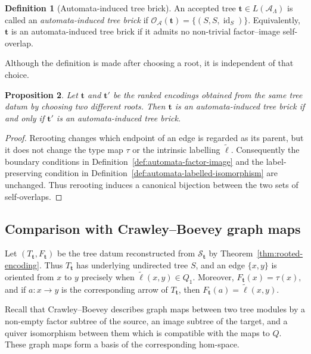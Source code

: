 \documentclass[11pt,a4paper]{amsart}
\theoremstyle{definition}
\newtheorem{definition}{Definition}[section]
\theoremstyle{plain}
\newtheorem{proposition}[definition]{Proposition}
\theoremstyle{remark}
\numberwithin{equation}{section}
\begin{document}
\begin{definition}[Automata-induced tree brick]\label{def:automata-tree-brick}
An accepted tree $\mathbf t\in L(\mathcal A_\Lambda)$ is called an \emph{automata-induced tree brick} if
$\mathscr O_{\mathcal A}(\mathbf t)
=
\{(S,S,\operatorname{id}_S)\}.$
Equivalently, $\mathbf t$ is an automata-induced tree brick if it admits no non-trivial factor--image self-overlap.
\end{definition}

Although the definition is made after choosing a root, it is independent of that choice.

\begin{proposition}\label{prop:automata-brick-rerooting}
Let $\mathbf t$ and $\mathbf t'$ be the ranked encodings obtained from the same tree datum by choosing two different roots. Then $\mathbf t$ is an automata-induced tree brick if and only if $\mathbf t'$ is an automata-induced tree brick.
\end{proposition}

\begin{proof}
Rerooting changes which endpoint of an edge is regarded as its parent, but it does not change the type map $\tau$ or the intrinsic labelling $\widetilde{\ell}$. Consequently the boundary conditions in Definition~\ref{def:automata-factor-image} and the label-preserving condition in Definition~\ref{def:automata-labelled-isomorphism} are unchanged. Thus rerooting induces a canonical bijection between the two sets of self-overlaps.
\end{proof}

\subsection{Comparison with Crawley--Boevey graph maps}

Let $(T_{\mathbf t},F_{\mathbf t})$ be the tree datum reconstructed from $\mathcal S_{\mathbf t}$ by Theorem~\ref{thm:rooted-encoding}. Thus $T_{\mathbf t}$ has underlying undirected tree $S$, and an edge $\{x,y\}$ is oriented from $x$ to $y$ precisely when
$
\widetilde{\ell}(x,y)\in Q_1.
$
Moreover,
$
F_{\mathbf t}(x)=\tau(x),
$
and if $a:x\to y$ is the corresponding arrow of $T_{\mathbf t}$, then
$
F_{\mathbf t}(a)=\widetilde{\ell}(x,y).
$

Recall that Crawley--Boevey \cite[\S 2]{CB89} describes graph maps between two tree modules by a non-empty factor subtree of the source, an image subtree of the target, and a quiver isomorphism between them which is compatible with the maps to $Q$. These graph maps form a basis of the corresponding hom-space.
\end{document}
